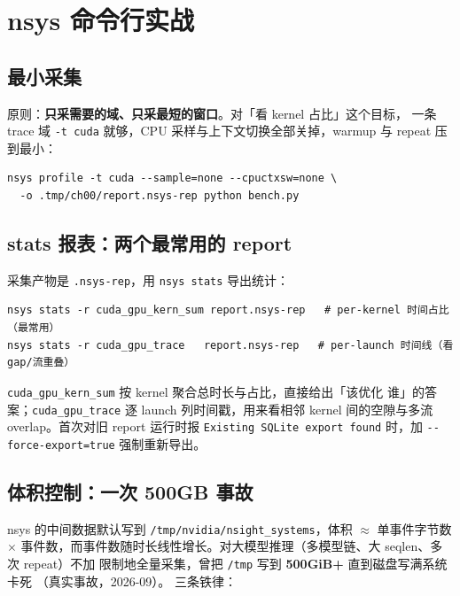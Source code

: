 \section{nsys 命令行实战}\label{sec:ch00-nsys}

\subsection{最小采集}

原则：\textbf{只采需要的域、只采最短的窗口}。对「看 kernel 占比」这个目标，
一条 trace 域 \texttt{-t cuda} 就够，CPU 采样与上下文切换全部关掉，warmup
与 repeat 压到最小：

\begin{lstlisting}[style=console, title={nsys 最小采集（kernel 时间占比场景）}]
nsys profile -t cuda --sample=none --cpuctxsw=none \
  -o .tmp/ch00/report.nsys-rep python bench.py
\end{lstlisting}

\subsection{stats 报表：两个最常用的 report}

采集产物是 \texttt{.nsys-rep}，用 \texttt{nsys stats} 导出统计：

\begin{lstlisting}[style=console, title={nsys stats 两个高频 report}]
nsys stats -r cuda_gpu_kern_sum report.nsys-rep   # per-kernel 时间占比（最常用）
nsys stats -r cuda_gpu_trace   report.nsys-rep   # per-launch 时间线（看 gap/流重叠）
\end{lstlisting}

\texttt{cuda\_\allowbreak{}gpu\_\allowbreak{}kern\_\allowbreak{}sum} 按 kernel 聚合总时长与占比，直接给出「该优化
谁」的答案；\texttt{cuda\_\allowbreak{}gpu\_\allowbreak{}trace} 逐 launch 列时间戳，用来看相邻 kernel
间的空隙与多流 overlap。首次对旧 report 运行时报
\texttt{Existing SQLite export found} 时，加 \texttt{-{}-force-export=\allowbreak{}true}
强制重新导出。

\subsection{体积控制：一次 500GB 事故}

nsys 的中间数据默认写到 \texttt{/\allowbreak{}tmp/\allowbreak{}nvidia/\allowbreak{}nsight\_\allowbreak{}systems}，体积 $\approx$
单事件字节数 $\times$ 事件数，而事件数随时长线性增长。对大模型推理（多模型链、大 seqlen、多次 repeat）不加
限制地全量采集，曾把 \texttt{/tmp} 写到 \textbf{500GiB+} 直到磁盘写满系统卡死
（真实事故，2026-09）。
三条铁律：

